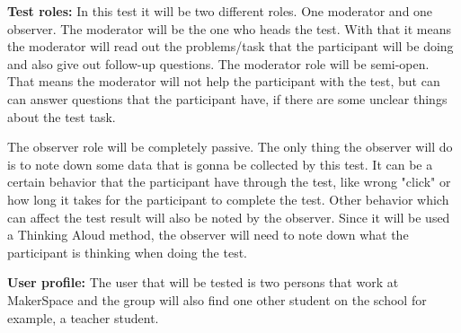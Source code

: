 \textbf{Test roles:} In this test it will be two different roles. One moderator and one observer. The moderator will be the one who heads the test. With that it means the moderator will read out the problems/task that the participant will be doing and also give out follow-up questions. The moderator role will be semi-open. That means the moderator will not help the participant with the test, but can can answer questions that the participant have, if there are some unclear things about the test task.

The observer role will be completely passive. The only thing the observer will do is to note down some data that is gonna be collected by this test. It can be a certain behavior that the participant have through the test, like wrong "click" or how long it takes for the participant to complete the test. Other behavior which can affect the test result will also be noted by the observer. Since it will be used a Thinking Aloud method, the observer will need to note down what the participant is thinking when doing the test. 

\textbf{User profile:} The user that will be tested is two persons that work at MakerSpace and the group will also find one other student on the school for example, a teacher student.

